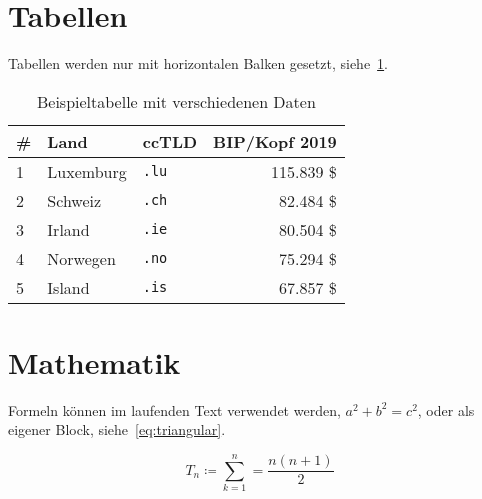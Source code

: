 \section{Tabellen}

Tabellen werden nur mit horizontalen Balken gesetzt, siehe~\cref{tab:example}.

\begin{table}[htbp]
  \centering
  \begin{tabularx}{\textwidth}{lXlr}\toprule
    \# & Land      & ccTLD      & BIP/Kopf 2019 \\ \midrule
    1  & Luxemburg & \verb|.lu| & 115.839 \$    \\
    2  & Schweiz   & \verb|.ch| & 82.484 \$     \\
    3  & Irland    & \verb|.ie| & 80.504 \$     \\
    4  & Norwegen  & \verb|.no| & 75.294 \$     \\
    5  & Island    & \verb|.is| & 67.857 \$     \\ \bottomrule
  \end{tabularx}
  \caption{Beispieltabelle mit verschiedenen Daten\label{tab:example}}
\end{table}

\section{Mathematik}

Formeln können im laufenden Text verwendet werden, \(a^2 + b^2 = c^2\),
oder als eigener Block, siehe~\cref{eq:triangular}.

\begin{equation}
  \label{eq:triangular}
  T_n \coloneq \sum^{n}_{k=1} = \frac{n(n+1)}{2}
\end{equation}
